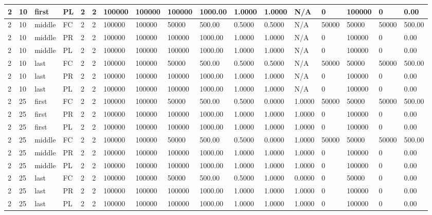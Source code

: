 \begin{tabular}{|l|l|l|l|l|l|l|l|l|l|l|l|l|l|l|l|l|}
2 & 10 & first & PL & 2 & 2 & 100000 & 100000 & 100000 & 1000.00 & 1.0000 & 1.0000 & N/A & 0 & 100000 & 0 & 0.00 \\ \hline
2 & 10 & middle & FC & 2 & 2 & 100000 & 100000 & 50000 & 500.00 & 0.5000 & 0.5000 & N/A & 50000 & 50000 & 50000 & 500.00 \\ \hline
2 & 10 & middle & PR & 2 & 2 & 100000 & 100000 & 100000 & 1000.00 & 1.0000 & 1.0000 & N/A & 0 & 100000 & 0 & 0.00 \\ \hline
2 & 10 & middle & PL & 2 & 2 & 100000 & 100000 & 100000 & 1000.00 & 1.0000 & 1.0000 & N/A & 0 & 100000 & 0 & 0.00 \\ \hline
2 & 10 & last & FC & 2 & 2 & 100000 & 100000 & 50000 & 500.00 & 0.5000 & 0.5000 & N/A & 50000 & 50000 & 50000 & 500.00 \\ \hline
2 & 10 & last & PR & 2 & 2 & 100000 & 100000 & 100000 & 1000.00 & 1.0000 & 1.0000 & N/A & 0 & 100000 & 0 & 0.00 \\ \hline
2 & 10 & last & PL & 2 & 2 & 100000 & 100000 & 100000 & 1000.00 & 1.0000 & 1.0000 & N/A & 0 & 100000 & 0 & 0.00 \\ \hline
2 & 25 & first & FC & 2 & 2 & 100000 & 100000 & 50000 & 500.00 & 0.5000 & 0.0000 & 1.0000 & 50000 & 50000 & 50000 & 500.00 \\ \hline
2 & 25 & first & PR & 2 & 2 & 100000 & 100000 & 100000 & 1000.00 & 1.0000 & 1.0000 & 1.0000 & 0 & 100000 & 0 & 0.00 \\ \hline
2 & 25 & first & PL & 2 & 2 & 100000 & 100000 & 100000 & 1000.00 & 1.0000 & 1.0000 & 1.0000 & 0 & 100000 & 0 & 0.00 \\ \hline
2 & 25 & middle & FC & 2 & 2 & 100000 & 100000 & 50000 & 500.00 & 0.5000 & 0.0000 & 1.0000 & 50000 & 50000 & 50000 & 500.00 \\ \hline
2 & 25 & middle & PR & 2 & 2 & 100000 & 100000 & 100000 & 1000.00 & 1.0000 & 1.0000 & 1.0000 & 0 & 100000 & 0 & 0.00 \\ \hline
2 & 25 & middle & PL & 2 & 2 & 100000 & 100000 & 100000 & 1000.00 & 1.0000 & 1.0000 & 1.0000 & 0 & 100000 & 0 & 0.00 \\ \hline
2 & 25 & last & FC & 2 & 2 & 100000 & 100000 & 50000 & 500.00 & 0.5000 & 1.0000 & 0.0000 & 0 & 50000 & 0 & 0.00 \\ \hline
2 & 25 & last & PR & 2 & 2 & 100000 & 100000 & 100000 & 1000.00 & 1.0000 & 1.0000 & 1.0000 & 0 & 100000 & 0 & 0.00 \\ \hline
2 & 25 & last & PL & 2 & 2 & 100000 & 100000 & 100000 & 1000.00 & 1.0000 & 1.0000 & 1.0000 & 0 & 100000 & 0 & 0.00 \\ \hline

\end{tabular}
